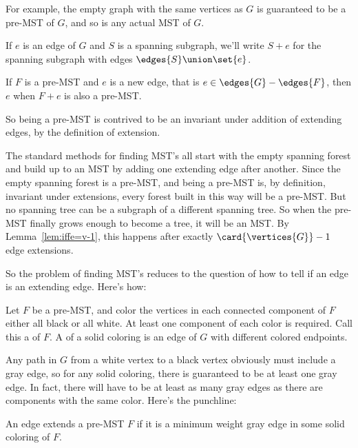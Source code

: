 For example, the empty graph with the same vertices as $G$ is guaranteed
to be a pre-MST of $G$, and so is any actual MST of $G$.

 \iffalse In the rest of this section, subgraphs and forests will
 always be spanning forests and spanning subgraphs of $G$, that is
 they will have the same vertices as $G$.\fi

If $e$ is an edge of $G$ and $S$ is a spanning subgraph, we'll write
$S+e$ for the spanning subgraph with edges $\edges{S} \union \set{e}$.
\begin{definition}
If $F$ is a pre-MST and $e$ is a new edge, that is $e \in
\edges{G}-\edges{F}$, then $e$  when $F+e$ is also a
pre-MST.
\end{definition}
So being a pre-MST is contrived to be an invariant under addition of
extending edges, by the definition of extension.

The standard methods for finding MST's all start with the empty
spanning forest and build up to an MST by adding one extending edge
after another.  Since the empty spanning forest is a pre-MST, and
being a pre-MST is, by definition, invariant under extensions, every
forest built in this way will be a pre-MST.  But no spanning tree can
be a subgraph of a different spanning tree.  So when the pre-MST
finally grows enough to become a tree, it will be an MST.  By
Lemma~\ref{lem:iffe=v-1}, this happens after exactly
$\card{\vertices{G}}-1$ edge extensions.

So the problem of finding MST's reduces to the question of how to tell
if an edge is an extending edge.  Here's how:

\begin{definition}
Let $F$ be a pre-MST, and color the vertices in each connected
component of $F$ either all black or all white.  At least one
component of each color is required.  Call this a  of $F$.  A  of a
solid coloring is an edge of $G$ with different colored endpoints.
\end{definition}

Any path in $G$ from a white vertex to a black vertex obviously must
include a gray edge, so for any solid coloring, there is guaranteed to
be at least one gray edge.  In fact, there will have to be at least as
many gray edges as there are components with the same color.  Here's
the punchline:

\begin{lemma}\label{lem:edgeextends}
An edge extends a pre-MST $F$ if it is a minimum weight gray edge in
some solid coloring of $F$.
\end{lemma}

